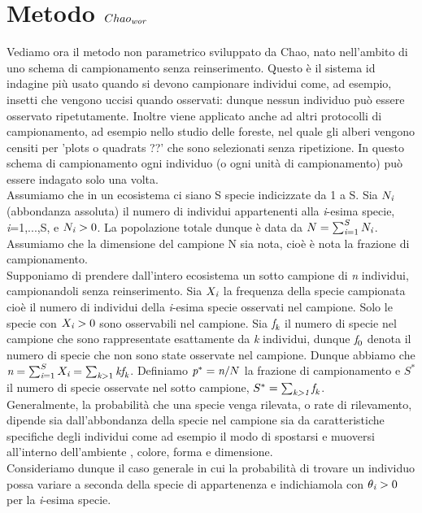 \section{Metodo $Chao_\emph{wor}$}
Vediamo ora il metodo non parametrico sviluppato da Chao, nato nell'ambito di uno schema di campionamento senza reinserimento. Questo è il sistema id indagine più usato quando si devono campionare individui come, ad esempio, insetti che vengono uccisi quando osservati: dunque nessun individuo può essere osservato ripetutamente. Inoltre viene applicato anche ad altri protocolli di campionamento, ad esempio nello studio delle foreste, nel quale gli alberi vengono censiti per 'plots o quadrats ??' che sono selezionati senza ripetizione. In questo schema di campionamento ogni individuo (o ogni unità di campionamento) può essere indagato solo una volta.\\
Assumiamo che in un ecosistema ci siano S specie indicizzate da 1 a S.
Sia $N_\emph{i}$ (abbondanza assoluta) il numero di individui appartenenti alla \emph{i}-esima specie, \emph{i}=1,...,S, e $N_\emph{i}>0$. La popolazione totale dunque è data da $N=\sum_{\emph{i}=1}^{S} N_\emph{i}$. Assumiamo che la dimensione del campione N sia nota, cioè è nota la frazione di campionamento.\\
Supponiamo di prendere dall'intero ecosistema un sotto campione di \emph{n} individui, campionandoli senza reinserimento. Sia $X_\emph{i}$ la frequenza della specie campionata cioè il numero di individui della \emph{i}-esima specie osservati nel campione. Solo le specie con  $X_\emph{i}>0$ sono osservabili nel campione. Sia $\emph{f}_\emph{k}$ il numero di specie nel campione che sono rappresentate esattamente da \emph{k} individui, dunque $\emph{f}_0$ denota il numero di specie che non sono state osservate nel campione. Dunque abbiamo che $\emph{n}=\sum_{\emph{i}=1}^S X_\emph{i}=\sum_{\emph{k}>1} \emph{k}\emph{f}_\emph{k}$.
Definiamo $\emph{p}^*=\emph{n}/N$ la frazione di campionamento e $S^*$ il numero di specie osservate nel sotto campione, $S^*=\sum_{\emph{k>1}} \emph{f}_\emph{k}$.\\
Generalmente, la probabilità che una specie venga rilevata, o rate di rilevamento, dipende sia dall'abbondanza della specie nel campione sia da caratteristiche specifiche degli individui come ad esempio il modo di spostarsi e muoversi all'interno dell'ambiente , colore, forma e dimensione.\\ Consideriamo dunque il caso generale in cui la probabilità di trovare un individuo possa variare a seconda della specie di appartenenza e indichiamola con $\theta_\emph{i}>0$ per la \emph{i}-esima specie.
